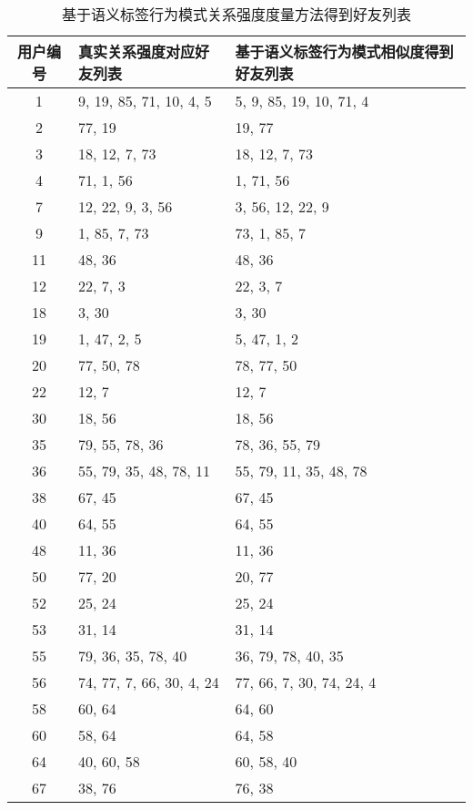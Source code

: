 \begin{table}[htbp]
  \centering
  \caption[基于语义标签行为模式相似度得到好友列表]{基于语义标签行为模式关系强度度量方法得到好友列表}
  \label{tab:semldaResult}
    \begin{tabular}{cll}%
      \toprule[1.5pt]
      用户编号 & 真实关系强度对应好友列表 & 基于语义标签行为模式相似度得到好友列表\\
      \midrule[1pt]
      1 & 9, 19, 85, 71, 10, 4, 5 & 5, 9, 85, 19, 10, 71, 4\\
      2 & 77, 19 & 19, 77\\
      3 & 18, 12, 7, 73 & 18, 12, 7, 73\\
      4 & 71, 1, 56 & 1, 71, 56\\
      7 & 12, 22, 9, 3, 56 & 3, 56, 12, 22, 9\\
      9 & 1, 85, 7, 73 & 73, 1, 85, 7\\
      11 & 48, 36 & 48, 36\\
      12 & 22, 7, 3 & 22, 3, 7\\
      18 & 3, 30 & 3, 30\\
      19 & 1, 47, 2, 5 & 5, 47, 1, 2\\
      20 & 77, 50, 78 & 78, 77, 50\\
      22 & 12, 7 & 12, 7\\
      30 & 18, 56 & 18, 56\\
      35 & 79, 55, 78, 36 & 78, 36, 55, 79\\
      36 & 55, 79, 35, 48, 78, 11 & 55, 79, 11, 35, 48, 78\\
      38 & 67, 45 & 67, 45\\
      40 & 64, 55 & 64, 55\\
      48 & 11, 36 & 11, 36\\
      50 & 77, 20 & 20, 77\\
      52 & 25, 24 & 25, 24\\
      53 & 31, 14 & 31, 14\\
      55 & 79, 36, 35, 78, 40 & 36, 79, 78, 40, 35\\
      56 & 74, 77, 7, 66, 30, 4, 24 & 77, 66, 7, 30, 74, 24, 4\\
      58 & 60, 64 & 64, 60\\
      60 & 58, 64 & 64, 58\\
      64 & 40, 60, 58 & 60, 58, 40\\
      67 & 38, 76 & 76, 38\\

\end{tabular}
\end{table}
